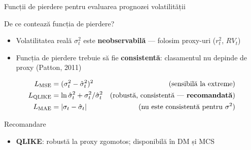 \documentclass[9pt, aspectratio=169, t]{beamer}
\begin{document}
\begin{frame}{Funcții de pierdere pentru evaluarea prognozei volatilității}
    \small
        \begin{block}{De ce contează funcția de pierdere?}
            \begin{itemize}
                \item Volatilitatea reală $\sigma_t^2$ este \textbf{neobservabilă} --- folosim proxy-uri ($r_t^2$, $RV_t$)
                \item Funcția de pierdere trebuie să fie \textbf{consistentă}: clasamentul nu depinde de proxy (Patton, 2011)
            \end{itemize}
        \end{block}
        \vspace{-2mm}
        \begin{defn}
            \vspace{-3mm}
            \begin{align*}
                L_{\text{MSE}} &= (\sigma_t^2 - \hat{\sigma}_t^2)^2 & \text{(sensibilă la extreme)}\\
                L_{\text{QLIKE}} &= \ln \hat{\sigma}_t^2 + \sigma_t^2 / \hat{\sigma}_t^2 & \text{(robustă, consistentă --- \textbf{recomandată})}\\
                L_{\text{MAE}} &= |\sigma_t - \hat{\sigma}_t| & \text{(nu este consistentă pentru $\sigma^2$)}
            \end{align*}
        \end{defn}
        \vspace{-1mm}
        \begin{alertblock}{Recomandare}
            \begin{itemize}
                \item \textbf{QLIKE}: robustă la proxy zgomotos; disponibilă în DM și MCS
            \end{itemize}
        \end{alertblock}
\end{frame}
\end{document}
